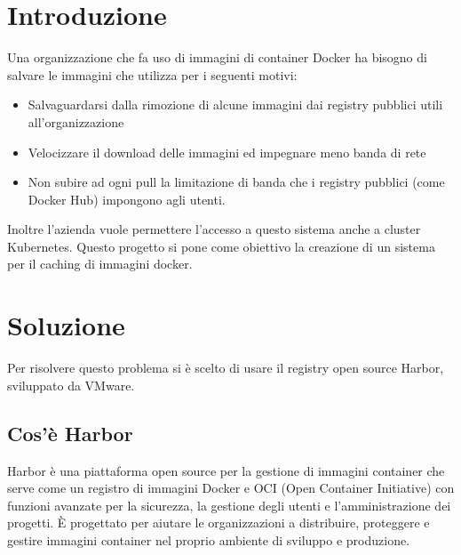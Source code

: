 \documentclass[12pt]{report}
\begin{document}
\title{}
\date{}



\maketitle
\tableofcontents

\chapter{Introduzione}
Una organizzazione che fa uso di immagini di container Docker ha bisogno di salvare le immagini che utilizza per i seguenti motivi:
\begin{itemize}
    \item Salvaguardarsi dalla rimozione di alcune immagini dai registry pubblici utili all'organizzazione
    \item Velocizzare il download delle immagini ed impegnare meno banda di rete
    \item Non subire ad ogni pull la limitazione di banda che i registry pubblici (come Docker Hub) impongono agli utenti\cite{hub-rate-limit}.
\end{itemize}
Inoltre l'azienda vuole permettere l'accesso a questo sistema anche a cluster Kubernetes.  
Questo progetto si pone come obiettivo la creazione di un sistema per il caching di immagini docker.
\chapter{Soluzione}
Per risolvere questo problema si è scelto di usare il registry open source Harbor, sviluppato da VMware.
\section{Cos'è Harbor}
Harbor\cite{harbor} è una piattaforma open source per la gestione di immagini container che serve come un registro di immagini Docker e OCI (Open Container Initiative) con funzioni avanzate per la sicurezza, la gestione degli utenti e l'amministrazione dei progetti. È progettato per aiutare le organizzazioni a distribuire, proteggere e gestire immagini container nel proprio ambiente di sviluppo e produzione.
\end{document}
